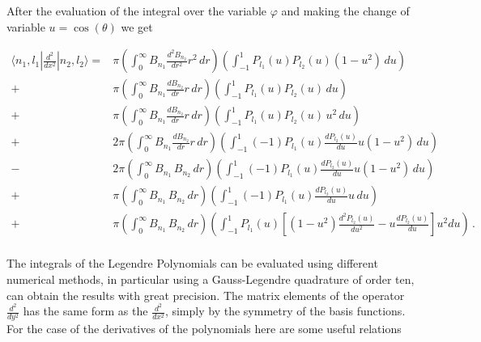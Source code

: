 \documentclass[12pt,a4paper]{article}
\newcommand{\ddx}[1]{\frac{d^2{#1}}{dx^2}}
\newcommand{\ddy}[1]{\frac{d^2{#1}}{dy^2}}
\newcommand{\dr}[1]{\frac{d{#1}}{dr}}
\newcommand{\ddr}[1]{\frac{d^2{#1}}{dr^2}}
\newcommand{\ct}{\cos(\theta)}
\begin{document}
\noindent After the evaluation of the integral over the variable $\varphi$ and making the
change of variable $u = \ct$ we get

\begin{equation}
\begin{split}
\langle n_1,l_1|\ddx{}|n_2,l_2\rangle =& \pi\left(\int_0^{\infty} B_{n_1} \ddr{B_{n_2}}r^2\,dr\right)
                                         \left(\int_{-1}^{1} P_{l_1}(u)P_{l_2}(u)(1-u^2)\,du\right) \\
                                      +& \pi\left(\int_0^{\infty} B_{n_1} \dr{B_{n_2}}r\,dr\right)
                                         \left(\int_{-1}^{1} P_{l_1}(u)P_{l_2}(u)\,du\right) \\
                                      +& \pi\left(\int_0^{\infty} B_{n_1} \dr{B_{n_2}}r\,dr\right)
                                         \left(\int_{-1}^{1} P_{l_1}(u)P_{l_2}(u)\,u^2\,du\right) \\
                                      +&2\pi\left(\int_0^{\infty} B_{n_1} \dr{B_{n_2}}r\,dr\right)
                                         \left(\int_{-1}^{1}(-1) P_{l_1}(u)\frac{dP_{l_2}(u)}{du}u(1-u^2)\,du\right) \\
                                      -&2\pi\left(\int_0^{\infty} B_{n_1}\,B_{n_2}\,dr\right)
                                         \left(\int_{-1}^{1}(-1) P_{l_1}(u)\frac{dP_{l_2}(u)}{du}u(1-u^2)\,du\right) \\
                                      +& \pi\left(\int_0^{\infty} B_{n_1}\,B_{n_2}\,dr\right)
                                         \left(\int_{-1}^{1}(-1) P_{l_1}(u)\frac{dP_{l_2}(u)}{du}u\,du\right) \\
                                      +& \pi\left(\int_0^{\infty} B_{n_1}\,B_{n_2}\,dr\right)
                                         \left(\int_{-1}^{1} P_{l_1}(u)\left[(1-u^2)\frac{d^2P_{l_2}(u)}{du^2}
                                                                             -u \frac{dP_{l_2}(u)}{du}\right]u^2du\right)\,. \\
\end{split}
\end{equation}

\noindent The integrals of the Legendre Polynomials can be evaluated using different
numerical methods, in particular using a Gauss-Legendre quadrature of order ten,
can obtain the results with great precision. The matrix elements of the
operator $\ddy{}$ has the same form as the $\ddx{}$, simply by the symmetry of
the basis functions. For the case of the derivatives of the
polynomials here are some useful relations
\end{document}
